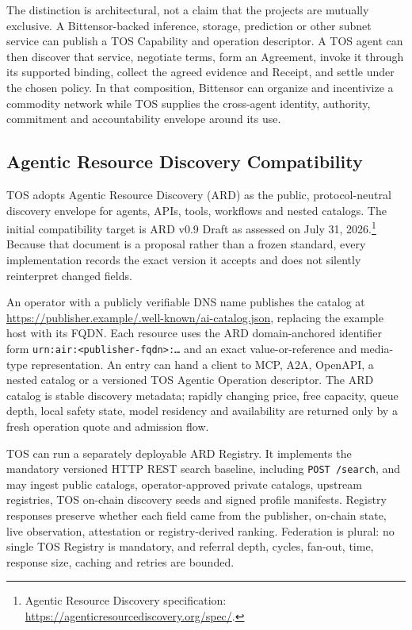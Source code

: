 \documentclass[11pt,oneside]{article}
\begin{document}
The distinction is architectural, not a claim that the projects are mutually exclusive. A
Bittensor-backed inference, storage, prediction or other subnet service can publish a TOS
Capability and operation descriptor. A TOS agent can then discover that service, negotiate
terms, form an Agreement, invoke it through its supported binding, collect the agreed evidence
and Receipt, and settle under the chosen policy. In that composition, Bittensor can organize
and incentivize a commodity network while TOS supplies the cross-agent identity, authority,
commitment and accountability envelope around its use.

\subsection{Agentic Resource Discovery Compatibility}

TOS adopts Agentic Resource Discovery (ARD) as the public, protocol-neutral discovery
envelope for agents, APIs, tools, workflows and nested catalogs. The initial compatibility
target is ARD v0.9 Draft as assessed on July 31, 2026.\footnote{Agentic Resource Discovery
specification: \url{https://agenticresourcediscovery.org/spec/}.} Because that document is a
proposal rather than a frozen standard, every implementation records the exact version it
accepts and does not silently reinterpret changed fields.

An operator with a publicly verifiable DNS name publishes the catalog at
\url{https://publisher.example/.well-known/ai-catalog.json}, replacing the
example host with its FQDN. Each resource uses the ARD
domain-anchored identifier form \texttt{urn:air:<publisher-fqdn>:\ldots} and an exact
value-or-reference and media-type representation. An entry can hand a client to MCP, A2A,
OpenAPI, a nested catalog or a versioned TOS Agentic Operation descriptor. The ARD catalog is
stable discovery metadata; rapidly changing price, free capacity, queue depth, local safety
state, model residency and availability are returned only by a fresh operation quote and admission
flow.

TOS can run a separately deployable ARD Registry. It implements the mandatory versioned HTTP
REST search baseline, including \texttt{POST /search}, and may ingest public catalogs,
operator-approved private catalogs, upstream registries, TOS on-chain discovery seeds and
signed profile manifests. Registry responses preserve whether each field came from the
publisher, on-chain state, live observation, attestation or registry-derived ranking.
Federation is plural: no single TOS Registry is mandatory, and referral depth, cycles,
fan-out, time, response size, caching and retries are bounded.
\end{document}
